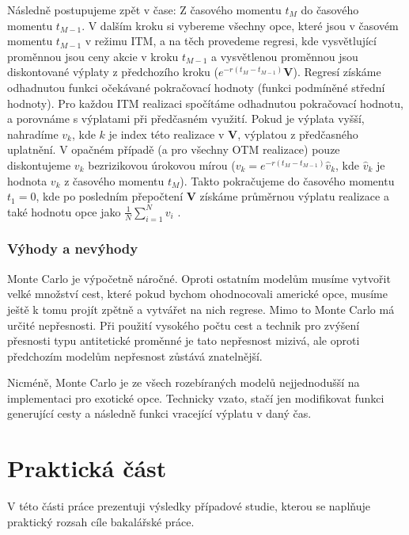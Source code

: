 \documentclass[male,czech,api_bc]{kitheses}
\begin{document}
    Následně postupujeme zpět v čase: Z časového momentu $t_M$ do časového momentu $t_{M - 1}$. V dalším kroku si vybereme všechny opce, které jsou v časovém momentu $t_{M - 1}$ v režimu ITM, a na těch provedeme regresi, kde vysvětlující proměnnou jsou ceny akcie v kroku $t_{M - 1}$ a vysvětlenou proměnnou jsou diskontované výplaty z předchozího kroku ($e^{-r(t_M - t_{M-1})} \textbf{V}$). Regresí získáme odhadnutou funkci očekávané pokračovací hodnoty (funkci podmíněné střední hodnoty). Pro každou ITM realizaci spočítáme odhadnutou pokračovací hodnotu, a porovnáme s výplatami při předčasném využití. Pokud je výplata vyšší, nahradíme $v_k$, kde $k$ je index této realizace v $\textbf{V}$, výplatou z předčasného uplatnění. V opačném případě (a pro všechny OTM realizace) pouze diskontujeme $v_k$ bezrizikovou úrokovou mírou ($v_k = e^{-r(t_M - t_{M-1})} \hat{v}_k$, kde $\hat{v}_k$ je hodnota $v_k$ z časového momentu $t_M$). Takto pokračujeme do časového momentu $t_1 = 0$, kde po posledním přepočtení \textbf{V} získáme průměrnou výplatu realizace a také hodnotu opce jako $\frac{1}{N} \sum_{i = 1}^{N} v_i$ \parencites{LongstaffSchwartz2001}[kapitola~80.16]{Wilmott2006}.

  \subsection{Výhody a nevýhody}

  Monte Carlo je výpočetně náročné. Oproti ostatním modelům musíme vytvořit velké množství cest, které pokud bychom ohodnocovali americké opce, musíme ještě k tomu projít zpětně a vytvářet na nich regrese. Mimo to Monte Carlo má určité nepřesnosti. Při použití vysokého počtu cest a technik pro zvýšení přesnosti typu antitetické proměnné je tato nepřesnost mizivá, ale oproti předchozím modelům nepřesnost zůstává znatelnější.

  Nicméně, Monte Carlo je ze všech rozebíraných modelů nejjednodušší na implementaci pro exotické opce. Technicky vzato, stačí jen modifikovat funkci generující cesty a následně funkci vracející výplatu v daný čas.


  \chapter{Praktická část}

  V této části práce prezentuji výsledky případové studie, kterou se naplňuje praktický rozsah cíle bakalářské práce.
\end{document}
